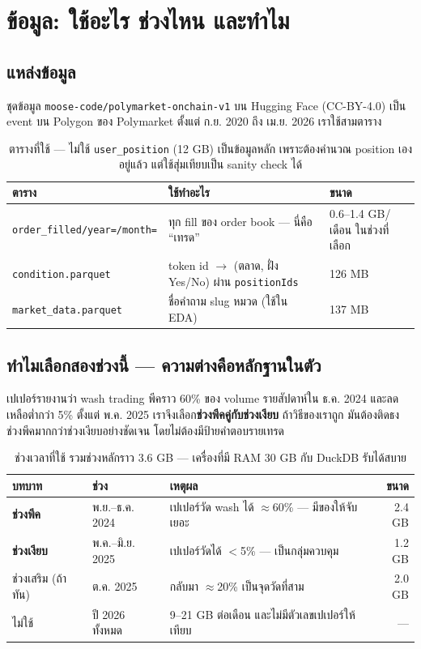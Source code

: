 \documentclass[11pt,a4paper]{article}
\newcommand{\sansall}{\sffamily}
\newcommand{\code}[1]{\texttt{#1}}
\newcommand{\thd}[1]{\sansall\bfseries #1}
\begin{document}
\section{ข้อมูล: ใช้อะไร ช่วงไหน และทำไม}
\label{sec:data}

\subsection{แหล่งข้อมูล}

ชุดข้อมูล \code{moose-code/polymarket-onchain-v1} บน Hugging Face (CC-BY-4.0)
เป็น event บน Polygon ของ Polymarket ตั้งแต่ ก.ย. 2020 ถึง เม.ย. 2026 เราใช้สามตาราง

\begin{table}[H]
\centering\small
\begin{tabular}{L{4.6cm}L{6.4cm}L{3.2cm}}
\toprule
\thd{ตาราง} & \thd{ใช้ทำอะไร} & \thd{ขนาด} \\
\midrule
\code{order\_filled/year=/month=} & ทุก fill ของ order book --- นี่คือ ``เทรด'' & 0.6--1.4 GB/เดือน ในช่วงที่เลือก \\
\addlinespace
\code{condition.parquet} & token id \ensuremath{\to} (ตลาด, ฝั่ง Yes/No) ผ่าน \code{positionIds} & 126 MB \\
\addlinespace
\code{market\_data.parquet} & ชื่อคำถาม slug หมวด (ใช้ใน EDA) & 137 MB \\
\bottomrule
\end{tabular}
\caption{ตารางที่ใช้ --- ไม่ใช้ \code{user\_position} (12 GB) เป็นข้อมูลหลัก
เพราะต้องคำนวณ position เองอยู่แล้ว แต่ใช้สุ่มเทียบเป็น sanity check ได้}
\end{table}

\subsection{ทำไมเลือกสองช่วงนี้ --- ความต่างคือหลักฐานในตัว}

เปเปอร์รายงานว่า wash trading พีคราว 60\% ของ volume รายสัปดาห์ใน ธ.ค. 2024
และลดเหลือต่ำกว่า 5\% ตั้งแต่ พ.ค. 2025 เราจึงเลือก\textbf{ช่วงพีคคู่กับช่วงเงียบ}
ถ้าวิธีของเราถูก มันต้องติดธงช่วงพีคมากกว่าช่วงเงียบอย่างชัดเจน
โดยไม่ต้องมีป้ายคำตอบรายเทรด

\begin{table}[H]
\centering\small
\begin{tabular}{L{2.8cm}L{3.2cm}L{5.8cm}r}
\toprule
\thd{บทบาท} & \thd{ช่วง} & \thd{เหตุผล} & \thd{ขนาด} \\
\midrule
\textbf{ช่วงพีค} & พ.ย.--ธ.ค. 2024 & เปเปอร์วัด wash ได้ $\approx$60\% --- มีของให้จับเยอะ & 2.4 GB \\
\textbf{ช่วงเงียบ} & พ.ค.--มิ.ย. 2025 & เปเปอร์วัดได้ $<$5\% --- เป็นกลุ่มควบคุม & 1.2 GB \\
ช่วงเสริม (ถ้าทัน) & ต.ค. 2025 & กลับมา $\approx$20\% เป็นจุดวัดที่สาม & 2.0 GB \\
\textcolor{bad}{ไม่ใช้} & ปี 2026 ทั้งหมด & 9--21 GB ต่อเดือน และไม่มีตัวเลขเปเปอร์ให้เทียบ & --- \\
\bottomrule
\end{tabular}
\caption{ช่วงเวลาที่ใช้ รวมช่วงหลักราว 3.6 GB --- เครื่องที่มี RAM 30 GB กับ DuckDB รับได้สบาย}
\end{table}
\end{document}
